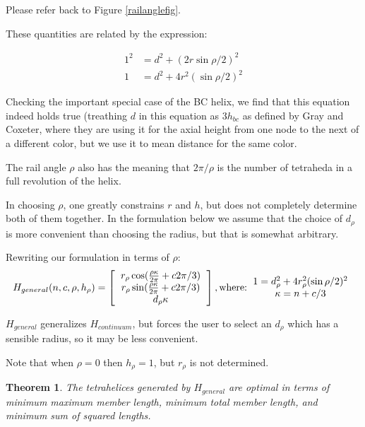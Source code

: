 \documentclass[11pt]{article}
\newtheorem{theorem}{Theorem}
\begin{document}
Please refer back to Figure \ref{railanglefig}.

 These quantities are related by the expression:

\begin{align*}
  1^2 &= d^2 + (2 r \sin{ \rho / 2})^2 \\
  1 &= d^2 + 4 r^2 (\sin{ \rho / 2})^2 
\end{align*}

Checking the important special case of the BC helix, we find that this equation
indeed holds true (treathing $d$ in this equation as $3 h_{bc}$ as defined by
Gray and Coxeter, where they are using it for the axial height from one node to
the next of a different color, but we use it to mean distance for the same color.

The rail angle $\rho$ also has the meaning that $2 \pi / \rho$ is the number of
tetraheda in a full revolution of the helix.

In choosing $\rho$, one greatly constrains $r$ and $h$, but does not completely
determine both of them together. In the formulation below we assume that
the choice of $d_{\rho}$ is more convenient than choosing the radius,
but that is somewhat arbitrary.


Rewriting our formulation in terms of $\rho$:
\[
H_{general}(n,c,\rho,h_{\rho}) =
\left [
  \begin{tabular}{c}
   $ r_{\rho} \cos(\frac{\rho \kappa}{2\pi} + c 2 \pi /3) $\\
   $ r_{\rho}  \sin(\frac{\rho \kappa}{2\pi} + c 2 \pi /3) $\\
   $ d_{\rho} \kappa $
  \end{tabular}
  \right ],
\text{where:}
\begin{tabular}{c}
  $   1 = d_{\rho}^2 + 4 r_{\rho}^2 (\sin{ \rho / 2})^2 $ \\
    $\kappa = n + c/3$ \\
  \end{tabular}      
\]

$H_{general}$ generalizes $H_{continuum}$, but forces the user to select an $d_{\rho}$
which has a sensible radius, so it may be less convenient.

Note that when $\rho = 0$ then $h_{\rho} = 1$, but $r_{\rho}$ is not determined.

\begin{theorem}
  \label{generalformulaoptimal}
  The tetrahelices generated by $H_{general}$ are optimal in terms of minimum maximum member length, minimum total member length, and minimum
  sum of squared lengths.
\end{theorem}
\end{document}
